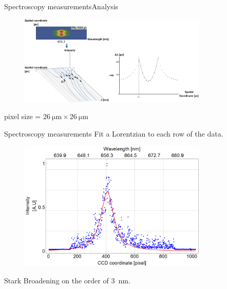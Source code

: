 \documentclass[draft]{beamer}
\begin{document}
  \begin{frame}{Spectroscopy measurements}{Analysis}
    \begin{figure}
      \includegraphics[width=0.8\textwidth]{figures/results/spectro/spectra_analysis.png}
    \end{figure}
    pixel size = $\SI{26}{\um} \times \SI{26}{\um}$
  \end{frame}
  \begin{frame}{Spectroscopy measurements}
    Fit a Lorentzian to each row of the data.
    \begin{figure}
      \includegraphics[width=0.8\textwidth]{figures/results/spectro/sample-lorentzian.png}
    \end{figure}
    Stark Broadening on the order of \SI{3}{\nm}.
  \end{frame}
\end{document}
